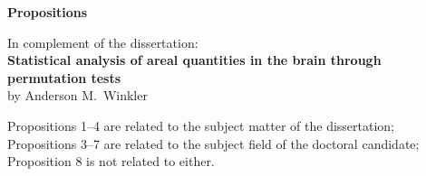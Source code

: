 \cleardoublepage
\newpage
\vspace*{\fill}
\begin{center}
\begin{Large}
\textbf{Propositions}
\end{Large}
\end{center}

\begin{center}
\begin{footnotesize}
\noindent
In complement of the dissertation:\\
\textbf{Statistical analysis of areal quantities in the brain through permutation tests}\\
by Anderson M.\ Winkler\par
\end{footnotesize}
\end{center}

\begin{center}
\begin{footnotesize}
\noindent
Propositions 1--4 are related to the subject matter of the dissertation; Propositions 3--7 are related to the subject field of the doctoral candidate; Proposition 8 is not related to either.\par
\end{footnotesize}
\end{center}


